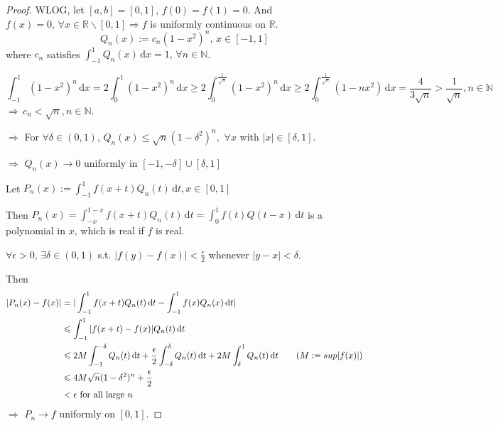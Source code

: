 \begin{proof}
    WLOG, let $ [a,b]=[0,1] $,  $ f(0)=f(1)=0 $.
    And  $ f(x)=0,\,{\forall x\in \mathbb{R }\backslash[0,1]} \Rightarrow f$ is uniformly continuous on  $ \mathbb{R } $.
    \[Q_n(x):=c_n(1-x^2)^n,\,x\in [-1,1]\]
    where  $ c_n  $ satisfies  $ \int_{-1}^{1} Q_n(x)\, \mathrm{d}x=1,\,\forall n\in\mathbb{N }   $.
    
     \[ \int_{-1}^{1} (1-x^2)^n\, \mathrm{d}x=2 \int_{0 }^{1 } (1-x^2)^n \, \mathrm{d}x \geqslant 2 \int_{0 }^{\frac{1 }{\sqrt{n }}}(1-x^2)^n \, \mathrm{d}x\geqslant 2 \int_{0 }^{\frac{1 }{\sqrt{n }}}(1-nx^2) \, \mathrm{d}x =\frac{4 }{3\sqrt{n}}>\frac{1 }{\sqrt{n}} ,n\in\mathbb{N }   \] $ \Rightarrow \,c_n<\sqrt{n},n\in \mathbb{N} $.
    
     $ \Rightarrow  $ For  $ \forall \delta\in(0,1) $,  $ Q_n(x) \leqslant \sqrt{n}(1-\delta^2)^n, $ $ \forall x  $ with  $ |x|\in [\delta,1] $.
     
      $ \Rightarrow $  $ Q_n(x)\rightarrow 0  $ uniformly in  $ [-1,-\delta]\cup[\delta,1] $ 

      Let  $ P_n(x):=\int_{-1}^{1 } f(x+t)Q_n(t)\, \mathrm{d}t, x\in[0,1]   $
      
      Then  $ P_n(x)=\int_{-x }^{1-x } f(x+t)Q_n(t)\, \mathrm{d}t=\int_{0 }^{1}f(t)Q(t-x) \, \mathrm{d}t     $ is a polynomial in $ x $, which is real if  $ f  $ is real.
      
       $ \forall \epsilon>0,\,\exists \delta\in(0,1) $ s.t. $ |f(y)-f(x)|<\frac{\epsilon}{2} $ whenever  $ |y-x|<\delta $.
       
       Then 
       \begin{align*}
        |P_n(x)-f(x)|&=|\int_{-1}^{1} f(x+t)Q_n(t)\, \mathrm{d}t-\int_{-1}^{1} f(x)Q_n(x)\, \mathrm{d}t|\\
        & \leqslant \int_{-1 }^{1} |f(x+t)-f(x)|Q_n(t)\, \mathrm{d}t\\
        & \leqslant 2M \int_{-1 }^{-\delta} Q_n(t)\, \mathrm{d}t+\frac{\epsilon}{2}\int_{-\delta}^{\delta} Q_n(t)\, \mathrm{d}t+2M \int_{\delta}^{1} Q_n(t)\, \mathrm{d}t\qquad (M:=sup|f(x)|)\\
        & \leqslant 4M\sqrt{n }(1-\delta^2 )^n+\frac{\epsilon}{2} \\
        &<\epsilon\text{ for all large  $ n $         }           
       \end{align*}
        $ \Rightarrow  $  $ P_n\rightarrow f  $ uniformly on  $ [0,1] $. 
\end{proof}

